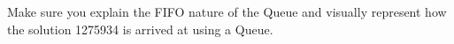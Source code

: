 \begin{parts}
\begin{solution}[0.75in]
Make sure you explain the FIFO nature of the Queue and visually represent how the solution 1275934 is arrived at using a Queue.
\end{solution}



\end{parts}

